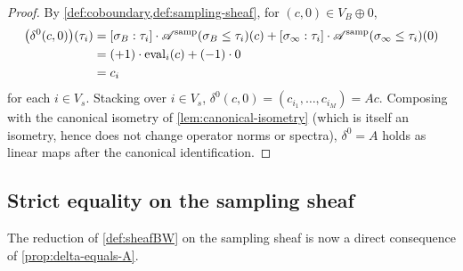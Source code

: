 \begin{proof}
By \cref{def:coboundary,def:sampling-sheaf}, for $(c, 0) \in V_B \oplus 0$,
\begin{align*}
  \bigl(\delta^0 (c, 0)\bigr)(\tau_i)
  &= [\sigma_B : \tau_i] \cdot \mathscr{A}^{\mathrm{samp}}(\sigma_B \le \tau_i)(c)
   + [\sigma_\infty : \tau_i] \cdot \mathscr{A}^{\mathrm{samp}}(\sigma_\infty \le \tau_i)(0) \\
  &= (+1) \cdot \operatorname{eval}_i(c) + (-1) \cdot 0 \\
  &= c_i
\end{align*}
for each $i \in V_s$. Stacking over $i \in V_s$,
$\delta^0 (c, 0) = (c_{i_1}, \ldots, c_{i_M}) = A c$. Composing with
the canonical isometry of \cref{lem:canonical-isometry} (which is
itself an isometry, hence does not change operator norms or
spectra), $\delta^0 = A$ holds as linear maps after the canonical
identification.
\end{proof}

\subsection{Strict equality on the sampling sheaf}\label{subsec:sheafbw-strict-equality}

The reduction of \cref{def:sheafBW} on the sampling sheaf is now a
direct consequence of \cref{prop:delta-equals-A}.

